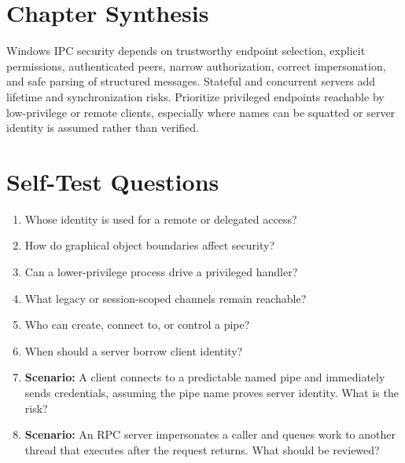 \documentclass[11pt,letterpaper]{article}
\begin{document}
\section{Chapter Synthesis}
Windows IPC security depends on trustworthy endpoint selection, explicit permissions, authenticated peers, narrow authorization, correct impersonation, and safe parsing of structured messages. Stateful and concurrent servers add lifetime and synchronization risks. Prioritize privileged endpoints reachable by low-privilege or remote clients, especially where names can be squatted or server identity is assumed rather than verified.
\section{Self-Test Questions}
\begin{enumerate}
\item Whose identity is used for a remote or delegated access?
\item How do graphical object boundaries affect security?
\item Can a lower-privilege process drive a privileged handler?
\item What legacy or session-scoped channels remain reachable?
\item Who can create, connect to, or control a pipe?
\item When should a server borrow client identity?
\item \textbf{Scenario:} A client connects to a predictable named pipe and immediately sends credentials, assuming the pipe name proves server identity. What is the risk?
\item \textbf{Scenario:} An RPC server impersonates a caller and queues work to another thread that executes after the request returns. What should be reviewed?
\end{enumerate}
\clearpage
\end{document}
